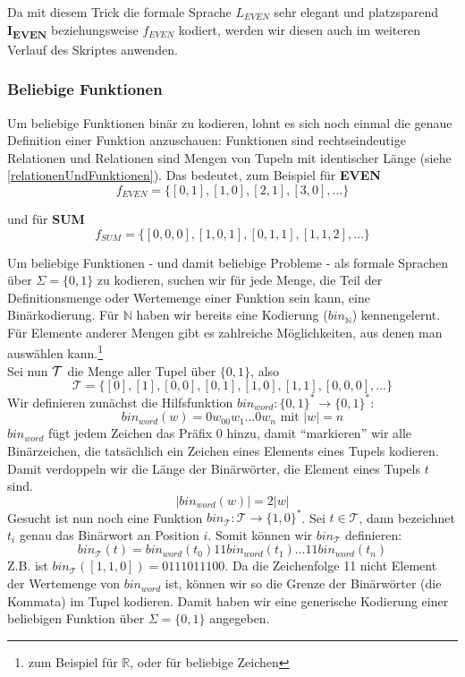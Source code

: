 Da mit diesem Trick die formale Sprache $L_{EVEN}$ sehr elegant und platzsparend
\textbf{I\textsubscript{EVEN}} beziehungsweise $f_{EVEN}$ kodiert,
werden wir diesen auch im weiteren Verlauf des Skriptes anwenden.

\subsubsection{Beliebige Funktionen}
Um beliebige Funktionen binär zu kodieren,
lohnt es sich noch einmal die genaue Definition einer Funktion anzuschauen:
Funktionen sind rechtseindeutige Relationen und Relationen sind Mengen von Tupeln mit identischer Länge (siehe \autoref{relationenUndFunktionen}).
Das bedeutet, zum Beispiel für \textbf{EVEN}
\[
    f_{EVEN} = \{ [0,1], [1,0], [2,1], [3,0], \ldots \}
\]

und für \textbf{SUM}
\[
    f_{SUM} = \{ [0,0,0], [1,0,1], [0,1,1], [1,1,2], \ldots \}
\]

Um beliebige Funktionen - und damit beliebige Probleme -
als formale Sprachen über $\Sigma = \{0,1\}$ zu kodieren,
suchen wir für jede Menge,
die Teil der Definitionsmenge oder Wertemenge einer Funktion sein kann,
eine Binärkodierung.
Für $\mathbb{N}$
haben wir bereits eine Kodierung ($bin_{\mathbb{N}}$) kennengelernt.
Für Elemente anderer Mengen gibt es zahlreiche Möglichkeiten,
aus denen man auswählen kann.\footnote{
    zum Beispiel \cite{ieee754} für $\mathbb{R}$,
    oder \cite{RFC3629} für beliebige Zeichen
}\\

\noindent
Sei nun $\cal{T}$ die Menge aller Tupel über $\{0,1\}$, also
\[
    \mathcal{T} = \{[0], [1], [0,0], [0,1], [1,0], [1,1], [0,0,0], \ldots \}
\]
Wir definieren zunächst die Hilfsfunktion $bin_{word}: \{0,1\}^* \rightarrow \{0,1\}^*$:
\[
    bin_{word}(w) = 0w_00w_1\ldots0w_n \text{ mit } |w| = n
\]
$bin_{word}$ fügt jedem Zeichen das Präfix 0 hinzu,
damit ``markieren'' wir alle Binärzeichen,
die tatsächlich ein Zeichen eines Elements eines Tupels kodieren.
Damit verdoppeln wir die Länge der Binärwörter, die Element eines Tupels $t$ sind.
\[
    |bin_{word}(w)| = 2|w|
\]
Gesucht ist nun noch eine Funktion $bin_{\mathcal{T}}: \mathcal{T} \rightarrow \{1,0\}^*$.
Sei $t \in \mathcal{T}$, dann bezeichnet $t_i$ genau das Binärwort an Position $i$.
Somit können wir $bin_{\mathcal{T}}$ definieren:
\[
    bin_{\mathcal{T}}(t) = bin_{word}(t_0)11bin_{word}(t_1)\ldots 11bin_{word}(t_{n})
\]
Z.B. ist $bin_{\mathcal{T}}([1,1,0]) = 0111011100$.
Da die Zeichenfolge 11 nicht Element der Wertemenge von $bin_{word}$ ist,
können wir so die Grenze der Binärwörter (die Kommata) im Tupel kodieren.
Damit haben wir eine generische Kodierung einer beliebigen Funktion
über $\Sigma = \{0,1\}$ angegeben.

